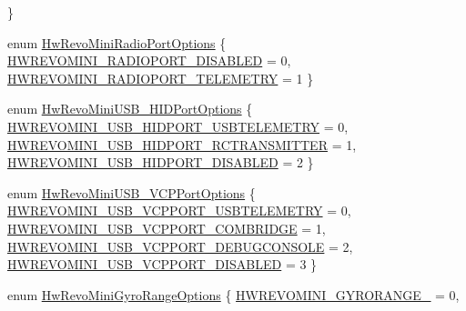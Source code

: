 \begin{DoxyCompactItemize}
 \}
\item 
enum \hyperlink{group___hw_revo_mini_ga304eecae16b0773209c4aa2e52e32a5e}{\-Hw\-Revo\-Mini\-Radio\-Port\-Options} \{ \hyperlink{group___hw_revo_mini_gga304eecae16b0773209c4aa2e52e32a5ea76e1bfc2a017054683a770c871a57bab}{\-H\-W\-R\-E\-V\-O\-M\-I\-N\-I\-\_\-\-R\-A\-D\-I\-O\-P\-O\-R\-T\-\_\-\-D\-I\-S\-A\-B\-L\-E\-D} = 0, 
\hyperlink{group___hw_revo_mini_gga304eecae16b0773209c4aa2e52e32a5ea72ba7886557a049608f41539c06787dd}{\-H\-W\-R\-E\-V\-O\-M\-I\-N\-I\-\_\-\-R\-A\-D\-I\-O\-P\-O\-R\-T\-\_\-\-T\-E\-L\-E\-M\-E\-T\-R\-Y} = 1
 \}
\item 
enum \hyperlink{group___hw_revo_mini_gad5ace8ca47a6ae4f1be2b683d2680061}{\-Hw\-Revo\-Mini\-U\-S\-B\-\_\-\-H\-I\-D\-Port\-Options} \{ \hyperlink{group___hw_revo_mini_ggad5ace8ca47a6ae4f1be2b683d2680061a8786668949a5956e81802cf903af9aec}{\-H\-W\-R\-E\-V\-O\-M\-I\-N\-I\-\_\-\-U\-S\-B\-\_\-\-H\-I\-D\-P\-O\-R\-T\-\_\-\-U\-S\-B\-T\-E\-L\-E\-M\-E\-T\-R\-Y} = 0, 
\hyperlink{group___hw_revo_mini_ggad5ace8ca47a6ae4f1be2b683d2680061a1ecf2855474273cb52276f4d1887af9d}{\-H\-W\-R\-E\-V\-O\-M\-I\-N\-I\-\_\-\-U\-S\-B\-\_\-\-H\-I\-D\-P\-O\-R\-T\-\_\-\-R\-C\-T\-R\-A\-N\-S\-M\-I\-T\-T\-E\-R} = 1, 
\hyperlink{group___hw_revo_mini_ggad5ace8ca47a6ae4f1be2b683d2680061a254d6477d998f82229b6aea21ee6c25e}{\-H\-W\-R\-E\-V\-O\-M\-I\-N\-I\-\_\-\-U\-S\-B\-\_\-\-H\-I\-D\-P\-O\-R\-T\-\_\-\-D\-I\-S\-A\-B\-L\-E\-D} = 2
 \}
\item 
enum \hyperlink{group___hw_revo_mini_ga0f243bcff951ec94a0758fe540754af8}{\-Hw\-Revo\-Mini\-U\-S\-B\-\_\-\-V\-C\-P\-Port\-Options} \{ \hyperlink{group___hw_revo_mini_gga0f243bcff951ec94a0758fe540754af8a89b58f47f1370069475d8185a39ee8f4}{\-H\-W\-R\-E\-V\-O\-M\-I\-N\-I\-\_\-\-U\-S\-B\-\_\-\-V\-C\-P\-P\-O\-R\-T\-\_\-\-U\-S\-B\-T\-E\-L\-E\-M\-E\-T\-R\-Y} = 0, 
\hyperlink{group___hw_revo_mini_gga0f243bcff951ec94a0758fe540754af8afd3af646f122deef5bf13a7e307abd68}{\-H\-W\-R\-E\-V\-O\-M\-I\-N\-I\-\_\-\-U\-S\-B\-\_\-\-V\-C\-P\-P\-O\-R\-T\-\_\-\-C\-O\-M\-B\-R\-I\-D\-G\-E} = 1, 
\hyperlink{group___hw_revo_mini_gga0f243bcff951ec94a0758fe540754af8a1032d20051db2ea41194decabb0a7a05}{\-H\-W\-R\-E\-V\-O\-M\-I\-N\-I\-\_\-\-U\-S\-B\-\_\-\-V\-C\-P\-P\-O\-R\-T\-\_\-\-D\-E\-B\-U\-G\-C\-O\-N\-S\-O\-L\-E} = 2, 
\hyperlink{group___hw_revo_mini_gga0f243bcff951ec94a0758fe540754af8ae831f4f2d606102181b7e7d20da771fe}{\-H\-W\-R\-E\-V\-O\-M\-I\-N\-I\-\_\-\-U\-S\-B\-\_\-\-V\-C\-P\-P\-O\-R\-T\-\_\-\-D\-I\-S\-A\-B\-L\-E\-D} = 3
 \}
\item 
enum \hyperlink{group___hw_revo_mini_gaa83cc2d5c1ac7b66b450dbe42295ebdf}{\-Hw\-Revo\-Mini\-Gyro\-Range\-Options} \{ \hyperlink{group___hw_revo_mini_ggaa83cc2d5c1ac7b66b450dbe42295ebdfa4de4fec1f4a6c95451eab802c46fb823}{\-H\-W\-R\-E\-V\-O\-M\-I\-N\-I\-\_\-\-G\-Y\-R\-O\-R\-A\-N\-G\-E\-\_} = 0, 

\end{DoxyCompactItemize}
